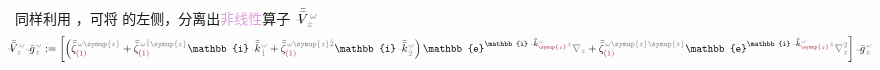 同样利用 ，可将  的左侧，分离出\textcolor{Plum}{非线性}算子 $\xint{\mathcolor{gray}{-}}{21}{\bar{\bar{V}}}^{\;\! \mathcolor{gray}{\omega}}_{\;\! \mathcolor{gray}{z}}$
\begin{subequations}
\begin{align}
	\hspace*{-0.4em} \!\!\! \xint{\mathcolor{gray}{-}}{25}{\bar{\bar{V}}}^{\;\! \mathcolor{gray}{\omega}}_{\;\! \mathcolor{gray}{z}} \xint{{}^{}_{\mathcolor{gray}{-}}}{10}{\bar{g}}^{\;\!\mathcolor{gray}{\omega}}_{\;\! \mathcolor{gray}{z}} &:= \left[ \left( \bar{\bar{\zeta}}^{\;\! \mathcolor{gray}{\omega} \mathcolor{gray}{\symup{z}}}_{\textcolor{Maroon}{(1)}} + \bar{\bar{\zeta}}^{\;\! \mathcolor{gray}{\omega} \mathcolor{gray}{\check{1} \symup{z}}}_{\textcolor{Maroon}{(1)}} \mathbb{i} \xint{\begin{smallmatrix} ~ \\ {}^{}_{\mathcolor{gray}{-}} \\ ~ \end{smallmatrix}}{15}{\bar{\bar{k}}}_{\;\! \mathcolor{gray}{\check{1}}}^{\;\! \mathcolor{gray}{\omega}} + \bar{\bar{\zeta}}^{\;\! \mathcolor{gray}{\omega} \mathcolor{gray}{\symup{z} \check{2}}}_{\textcolor{Maroon}{(1)}} \mathbb{i} \xint{\begin{smallmatrix} ~ \\ {}^{}_{\mathcolor{gray}{-}} \\ ~ \end{smallmatrix}}{15}{\bar{\bar{k}}}_{\;\! \mathcolor{gray}{\check{2}}}^{\;\! \mathcolor{gray}{\omega}} \right) \mathbb{e}^{\mathbb{i} \xint{\begin{smallmatrix} ~ \\ {}^{}_{\mathcolor{gray}{-}} \\ ~ \end{smallmatrix}}{15}{\bar{\bar{k}}}_{\textcolor{Maroon}{\symup{z}}}^{\;\! \mathcolor{gray}{\omega}} \mathcolor{gray}{z}} \mathcolor{gray}{\nabla_z} + \bar{\bar{\zeta}}^{\;\! \mathcolor{gray}{\omega} \mathcolor{gray}{\symup{z} \symup{z}}}_{\textcolor{Maroon}{(1)}} \mathbb{e}^{\mathbb{i} \xint{\begin{smallmatrix} ~ \\ {}^{}_{\mathcolor{gray}{-}} \\ ~ \end{smallmatrix}}{15}{\bar{\bar{k}}}_{\textcolor{Maroon}{\symup{z}}}^{\;\! \mathcolor{gray}{\omega}} \mathcolor{gray}{z}} \mathcolor{gray}{\nabla_z^2} \right] \xint{{}^{}_{\mathcolor{gray}{-}}}{10}{\bar{g}}^{\;\!\mathcolor{gray}{\omega}}_{\;\! \mathcolor{gray}{z}} \label{eq:matrix_exp_eq-left_V} \\

\end{align}
\end{subequations}
